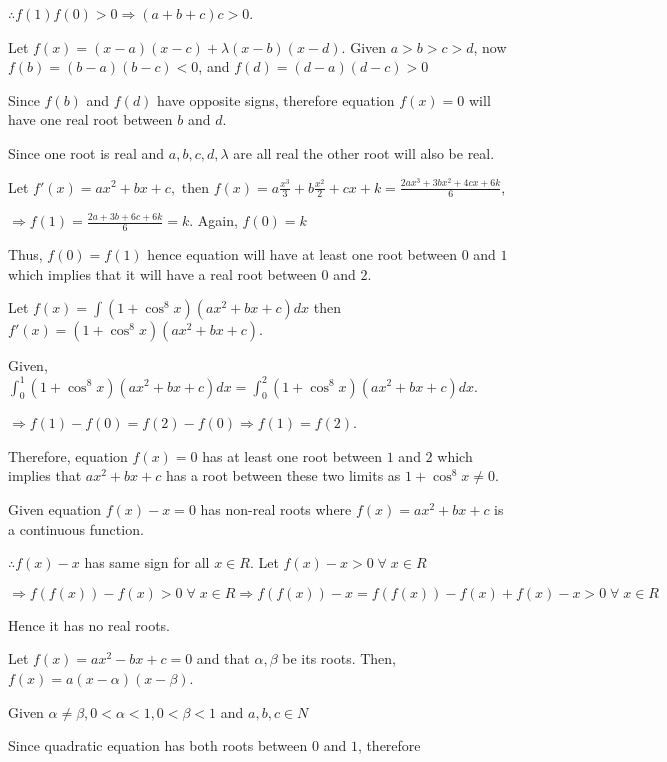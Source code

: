   $\therefore f(1)f(0) > 0 \Rightarrow (a + b + c)c > 0$.
\item Let $f(x) = (x - a)(x - c) + \lambda (x - b)(x - d)$. Given $a > b > c > d$, now $f(b) = (b - a)(b -
  c) < 0$, and $f(d) = (d - a)(d - c) > 0$

  Since $f(b)$ and $f(d)$ have opposite signs, therefore equation $f(x) = 0$ will have one real
  root between $b$ and $d$.

  Since one root is real and $a, b, c, d, \lambda$ are all real the other root will also be real.
\item Let $f'(x) = ax^2 + bx + c,$ then $f(x) = a\frac{x^3}{3} + b\frac{x^2}{2} + cx + k = \frac{2ax^3 +
  3bx^2 + 4cx + 6k}{6}$,

  $\Rightarrow f(1) = \frac{2a + 3b + 6c + 6k}{6} = k$. Again, $f(0) = k$

  Thus, $f(0) = f(1)$ hence equation will have at least one root between $0$ and $1$ which implies
  that it will have a real root between $0$ and $2$.
\item Let $f(x) = \displaystyle\int (1 + \cos^8x)(ax^2 + bx + c)dx$ then $f'(x) = (1 + \cos^8x)(ax^2 + bx + c)$.

  Given, $\displaystyle\int_0^1 (1 + \cos^8 x)(ax^2 + bx + c)dx = \int_0^2 (1 + \cos^8 x)(ax^2 + bx + c)dx$.

  $\Rightarrow f(1) - f(0) = f(2) - f(0) \Rightarrow f(1) = f(2)$.

  Therefore, equation $f(x) = 0$ has at least one root between $1$ and $2$ which implies that
  $ax^2 + bx + c$ has a root between these two limits as $1 + \cos^8x \ne 0$.
\item Given equation $f(x) - x = 0$ has non-real roots where $f(x) = ax^2 + bx + c$ is a continuous function.

  $\therefore f(x) - x$  has same sign for all $x \in R$. Let $f(x) - x > 0\;\forall\;x \in R$

  $\Rightarrow f(f(x)) - f(x) > 0\;\forall\;x\in R\Rightarrow f(f(x)) - x = f(f(x)) - f(x) + f(x) - x > 0\;\forall\;x\in R$

  Hence it has no real roots.
\item Let $f(x) = ax^2 - bx + c = 0$ and that $\alpha, \beta$ be its roots. Then, $f(x) = a(x - \alpha)(x - \beta)$.

  Given $\alpha \ne \beta, 0 < \alpha < 1, 0 < \beta < 1$ and $a, b, c \in N$

  Since quadratic equation has both roots between $0$ and $1$, therefore

